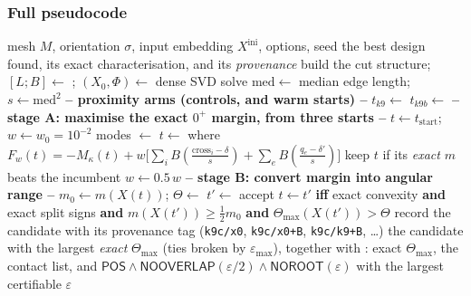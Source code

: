 \documentclass[11pt,a4paper]{article}
\theoremstyle{definition}
\newcommand{\Tmax}{\Theta_{\max}}
\newcommand{\file}[1]{\texttt{\small #1}}
\newcommand{\POS}{\textsf{POS}}
\newcommand{\NOOV}{\textsf{NOOVERLAP}}
\newcommand{\NOROOT}{\textsf{NOROOT}}
\begin{document}
\subsubsection{Full pseudocode}

\begin{algorithm}[t]
\caption{\texttt{design\_range\_max} --- the deliverable (K9c). \file{method/range\_embed.jl}, \file{method/design.jl}}
\label{alg:k9c}
\begin{algorithmic}[1]
\Require mesh $M$, orientation $\sigma$, input embedding $X^{\mathrm{ini}}$, options, seed
\Ensure the best design found, its exact characterisation, and its \emph{provenance}
\State build the cut structure; $[L;B]\gets$ ; $(X_0,\Phi)\gets$ dense SVD solve 
\State $\mathrm{med}\gets$ median edge length; $s\gets\mathrm{med}^2$
\Statex \textbf{-- proximity arms (controls, and warm starts) --}
\State $t_{k9}\gets$ 
\State $t_{k9b}\gets$ 
\Statex \textbf{-- stage A: maximise the exact $0^+$ margin, from three starts --}
  \State $t\gets t_{\mathrm{start}}$; $w\gets w_0=10^{-2}$
   
    \State modes $\gets$  
    \State $t\gets$  where
      $F_w(t) = -M_\kappa(t) + w\bigl[\sum_i B(\tfrac{\mathrm{cross}_i-\delta}{s}) + \sum_e B(\tfrac{q_e-\delta'}{s})\bigr]$
     keep $t$ if its \emph{exact} $m$ beats the incumbent \EndIf
    \State $w\gets 0.5\,w$
  \EndFor
  \Statex \textbf{-- stage B: convert margin into angular range --}
    \State $m_0\gets m(X(t))$; $\Theta\gets$ 
        \State $t'\gets$ 
        \State accept $t\gets t'$ \textbf{iff} exact convexity \textbf{and} exact split signs \textbf{and} $m(X(t'))\ge\tfrac12 m_0$ \textbf{and} $\Tmax(X(t'))>\Theta$
      \EndFor
    \EndFor
  \EndIf
  \State record the candidate with its provenance tag (\texttt{k9c/x0}, \texttt{k9c/x0+B}, \texttt{k9c/k9+B}, \dots)
\EndFor
\State \Return the candidate with the largest \emph{exact} $\Tmax$ (ties broken by $\varepsilon_{\max}$), together with : exact $\Tmax$, the contact list, and $\POS\wedge\NOOV(\varepsilon/2)\wedge\NOROOT(\varepsilon)$ with the largest certifiable $\varepsilon$
\end{algorithmic}
\end{algorithm}
\end{document}
